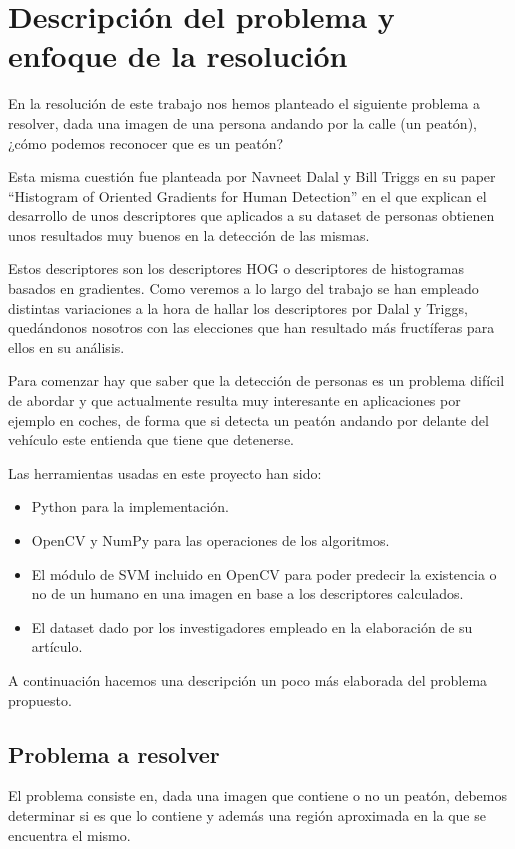 \documentclass[a4paper,12pt]{article}
\begin{document}
\section{Descripción del problema y enfoque de la resolución}

En la resolución de este trabajo nos hemos planteado el siguiente problema a resolver, dada una imagen de una persona andando por la calle (un peatón), ¿cómo podemos reconocer que es un peatón?

Esta misma cuestión fue planteada por Navneet Dalal y Bill Triggs en su paper ``Histogram of Oriented Gradients for Human Detection'' en el que explican el desarrollo de unos descriptores que aplicados a su dataset de personas obtienen unos resultados muy buenos en la detección de las mismas.

Estos descriptores son los descriptores HOG o descriptores de histogramas basados en gradientes. Como veremos a lo largo del trabajo se han empleado distintas variaciones a la hora de hallar los descriptores por Dalal y Triggs, quedándonos nosotros con las elecciones que han resultado más fructíferas para ellos en su análisis.

Para comenzar hay que saber que la detección de personas es un problema difícil de abordar y que actualmente resulta muy interesante en aplicaciones por ejemplo en coches, de forma que si detecta un peatón andando por delante del vehículo este entienda que tiene que detenerse.

Las herramientas usadas en este proyecto han sido:
\begin{itemize}
	\item Python para la implementación.
	\item OpenCV y NumPy para las operaciones de los algoritmos.
	\item El módulo de SVM incluido en OpenCV para poder predecir la existencia o no de un humano en una imagen en base a los descriptores calculados.
	\item El dataset dado por los investigadores empleado en la elaboración de su artículo.
\end{itemize}

A continuación hacemos una descripción un poco más elaborada del problema propuesto.

\subsection{Problema a resolver}

El problema consiste en, dada una imagen que contiene o no un peatón, debemos determinar si es que lo contiene y además una región aproximada en la que se encuentra el mismo.
\end{document}
